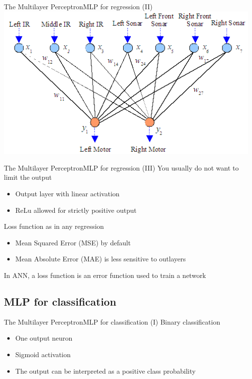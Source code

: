 \documentclass[10pt,compress]{beamer} %
\begin{document}
\begin{frame}{The Multilayer Perceptron}{MLP for regression (II)}
	\centering\includegraphics[width=0.9\linewidth]{figs/robot.png}
\end{frame}

\begin{frame}{The Multilayer Perceptron}{MLP for regression (III)}
	You usually do not want to limit the output
	\begin{itemize}
		\item Output layer with linear activation
		\item ReLu allowed for strictly positive output
	\end{itemize}

	Loss function as in any regression
	\begin{itemize}
		\item Mean Squared Error (MSE) by default
		\item Mean Absolute Error (MAE) is less sensitive to outlayers
	\end{itemize}
	In ANN, a loss function is an error function used to train a network
\end{frame}

\subsection{MLP for classification}

\begin{frame}{The Multilayer Perceptron}{MLP for classification (I)} 
	Binary classification
	\begin{itemize}
		\item One output neuron
		\item Sigmoid activation
		\item The output can be interpreted as a positive class probability
	\end{itemize}

	\centering 
\end{frame}
\end{document}
